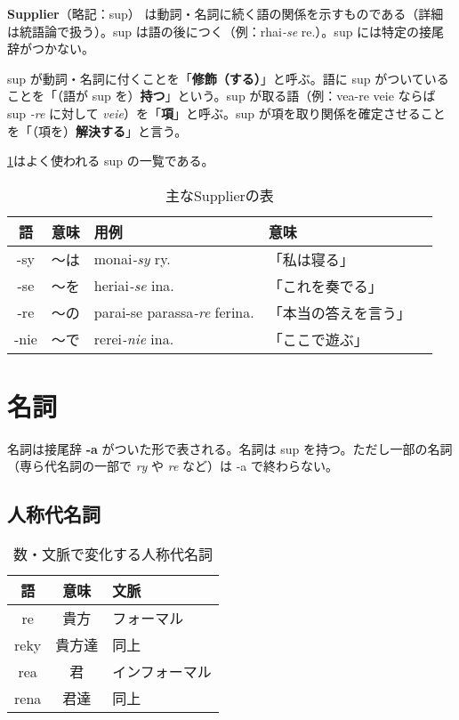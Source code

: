 \textbf{Supplier}（略記：sup） は動詞・名詞に続く語の関係を示すものである（詳細は統語論で扱う）。sup は語の後につく（例：rhai\emph{-se} re.）。sup には特定の接尾辞がつかない。

sup が動詞・名詞に付くことを「\textbf{修飾（する）}」と呼ぶ。語に sup がついていることを「（語が sup を）\textbf{持つ}」という。sup が取る語（例：vea-re veie ならば sup \emph{-re} に対して \emph{veie}）を「\textbf{項}」と呼ぶ。sup が項を取り関係を確定させることを「（項を）\textbf{解決する}」と言う。

\cref{table:common-sups}はよく使われる sup の一覧である。

\begin{table}[H]
    \centering
    \caption{主なSupplierの表}
    \label{table:common-sups}
    \begin{tabular}{cclll}
        \toprule
        語 & 意味 & 用例 & 意味 \\
        \midrule
        -sy  & ～は & monai\emph{-sy} ry.                & 「私は寝る」\\
        -se  & ～を & heriai\emph{-se} ina.              & 「これを奏でる」\\
        -re  & ～の & parai-se parassa\emph{-re} ferina. & 「本当の答えを言う」\\
        -nie & ～で & rerei\emph{-nie} ina.              & 「ここで遊ぶ」 \\
        \bottomrule
    \end{tabular}
\end{table}

\section{名詞}

名詞は接尾辞 \textbf{-a} がついた形で表される。名詞は sup を持つ。ただし一部の名詞（専ら代名詞の一部で \emph{ry} や \emph{re} など）は -a で終わらない。

\subsection{人称代名詞}

\begin{wraptable}[7]{r}{50mm}
    \centering
    \caption{数・文脈で変化する人称代名詞}
    \label{table:list-of-re-rea}
    \begin{tabular}{ccl}
        \toprule
        語 & 意味 & 文脈 \\
        \midrule
        re    & 貴方  & フォーマル \\
        reky  & 貴方達 & 同上 \\
        rea   & 君    & インフォーマル \\
        rena  & 君達  & 同上 \\
        \bottomrule
    \end{tabular}
\end{wraptable}

